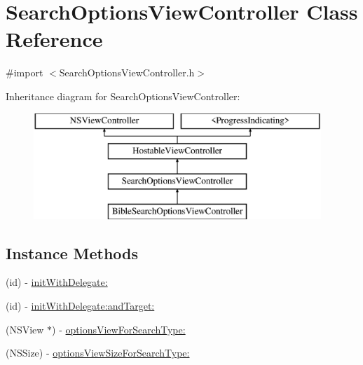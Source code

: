 \hypertarget{interface_search_options_view_controller}{\section{Search\-Options\-View\-Controller Class Reference}
\label{interface_search_options_view_controller}
}


{\ttfamily \#import $<$Search\-Options\-View\-Controller.\-h$>$}

Inheritance diagram for Search\-Options\-View\-Controller\-:\begin{figure}[H]
\begin{center}
\leavevmode
\includegraphics[height=4.000000cm]{interface_search_options_view_controller}
\end{center}
\end{figure}
\subsection*{Instance Methods}
\begin{DoxyCompactItemize}
\item 
(id) -\/ \hyperlink{interface_search_options_view_controller_a31987d71b58e0520588676a4f6896d2c}{init\-With\-Delegate\-:}
\item 
(id) -\/ \hyperlink{interface_search_options_view_controller_a52c4b87245288cf145a3033678bd3fb3}{init\-With\-Delegate\-:and\-Target\-:}
\item 
(N\-S\-View $\ast$) -\/ \hyperlink{interface_search_options_view_controller_ad464c93487f7efdce99927d21fb1403d}{options\-View\-For\-Search\-Type\-:}
\item 
(N\-S\-Size) -\/ \hyperlink{interface_search_options_view_controller_a1969b5e8c4d91cabfc943e0189347051}{options\-View\-Size\-For\-Search\-Type\-:}
\end{DoxyCompactItemize}
